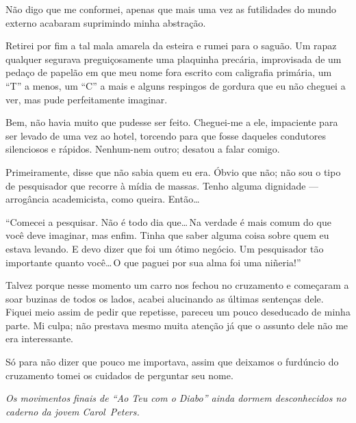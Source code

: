 Não digo que me conformei, apenas que mais uma vez as futilidades do mundo externo acabaram suprimindo minha abstração.

Retirei por fim a tal mala amarela da esteira e rumei para o saguão. Um rapaz qualquer segurava preguiçosamente uma plaquinha precária, improvisada de um pedaço de papelão em que meu nome fora escrito com caligrafia primária, um ``T'' a menos, um ``C'' a mais e alguns respingos de gordura que eu não cheguei a ver, mas pude perfeitamente imaginar.

Bem, não havia muito que pudesse ser feito. Cheguei-me a ele, impaciente para ser levado de uma vez ao hotel, torcendo para que fosse daqueles condutores silenciosos e rápidos. Nenhum-nem outro; desatou a falar comigo.

Primeiramente, disse que não sabia quem eu era. Óbvio que não; não sou o tipo de pesquisador que recorre à mídia de massas. Tenho alguma dignidade --- arrogância academicista, como queira. Então\ldots

``Comecei a pesquisar. Não é todo dia que\ldots\,Na verdade é mais comum do que você deve imaginar, mas enfim. Tinha que saber alguma coisa sobre quem eu estava levando. E devo dizer que foi um ótimo negócio. Um pesquisador tão importante quanto você\ldots\,O que paguei por sua alma foi uma niñeria!''

Talvez porque nesse momento um carro nos fechou no cruzamen\-to e começaram a soar buzinas de todos os lados, acabei alucinando as últimas sentenças dele. Fiquei meio assim de pedir que repetisse, pareceu um pouco deseducado de minha parte. Mi culpa; não prestava mesmo muita atenção já que o assunto dele não me era interessante.

Só para não dizer que pouco me importava, assim que deixamos o furdúncio do cruzamento tomei os cuidados de perguntar seu nome.

	\begin{center}
	\emph{Os movimentos finais de ``Ao Teu com o Diabo'' ainda dormem desconhecidos no caderno da jovem Carol~Peters.}
	\end{center}

